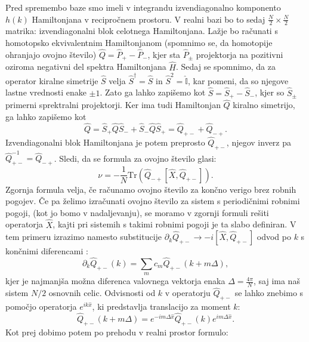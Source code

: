 Pred spremembo baze smo imeli v integrandu izvendiagonalno komponento $h(k)$ Hamiltonjana v recipročnem prostoru. V realni bazi bo to sedaj $\frac{N}{2} \times \frac{N}{2}$ matrika: izvendiagonalni blok celotnega Hamiltonjana. Lažje bo računati s homotopsko ekvivalentnim Hamiltonjanom (spomnimo se, da homotopije ohranjajo ovojno število) $\hat{Q} = \hat{P}_+ -  \hat{P}_-$, kjer sta $\hat{P}_\pm$ projektorja na pozitivni oziroma negativni del spektra Hamiltonjana $\hat{H}$. Sedaj se spomnimo, da za operator kiralne simetrije $\hat{S}$ velja $\hat{S}^\dagger = \hat{S} $ in $\hat{S}^2 = \hat{\mathbb{I}}$, kar pomeni, da so njegove lastne vrednosti enake $\pm 1$. Zato ga lahko zapišemo kot $\hat{S} = \hat{S}_+ - \hat{S}_-$, kjer so $\hat{S}_\pm$ primerni sprektralni projektorji. Ker ima tudi Hamiltonjan $\hat{Q}$ kiralno simetrijo, ga lahko zapišemo kot
\begin{equation}
\hat{Q} = \hat{S}_+ \hat{Q} \hat{S}_- + \hat{S}_- \hat{Q} \hat{S}_+ = \hat{Q}_{+-} + \hat{Q}_{-+}.
\end{equation} 
Izvendiagonalni blok Hamiltonjana je potem preprosto $\hat{Q}_{+-}$, njegov inverz pa $\hat{Q}_{+-}^{-1} = \hat{Q}_{-+}$.
Sledi, da se formula za ovojno število glasi:
\begin{equation}
\nu = -\frac{1}{N} \mathrm{Tr} \left( \hat{Q}_{-+} [\hat{X},\hat{Q}_{+-}] \right).
\end{equation}
Zgornja formula velja, če računamo ovojno število za končno verigo brez robnih pogojev. Če pa želimo izračunati ovojno število za sistem s periodičnimi robnimi pogoji, (kot jo bomo v nadaljevanju), se moramo v zgornji formuli rešiti operatorja $\hat{X}$, kajti  pri sistemih s takimi robnimi pogoji je ta slabo definiran.
V tem primeru izrazimo namesto substitucije $\partial_k \hat{Q}_{+-} \to -i [\hat{X}, \hat{Q}_{+-}]$ odvod po $k$ s končnimi diferencami \cite{diference}:
\begin{equation}
\partial_k \hat{Q}_{+-}(k) = \sum_m c_m \hat{Q}_{+-} (k+m \Delta ), 
\end{equation}
kjer je najmanjša možna diferenca valovnega vektorja enaka $\Delta  = \frac{4 \pi}{N}$, saj ima naš sistem $N/2$ osnovnih celic.
Odvisnosti od $k$ v operatorju $\hat{Q}_{+-}$ se lahko znebimo s pomočjo operatorja $e^{i k \hat{x}}$, ki predstavlja translacijo za moment $k$: 
\begin{equation}
\hat{Q}_{+-}(k+m \Delta ) =e ^{-i m \Delta  \hat{x}} \hat{Q}_{+-}(k) e^{i m \Delta  \hat{x}}.
\end{equation}
Kot prej dobimo potem po prehodu v realni prostor formulo:

